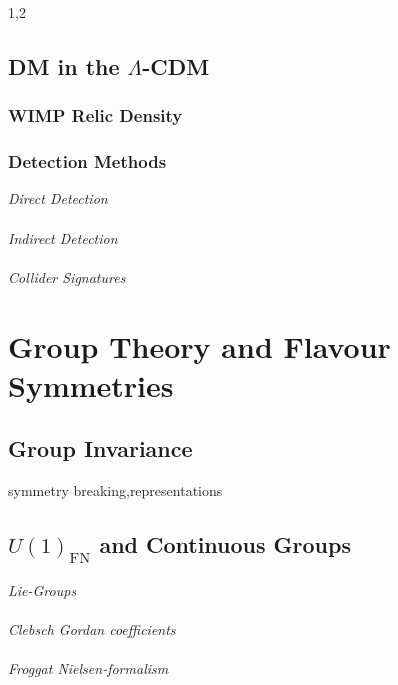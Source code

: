 \documentclass[11pt,a4paper,twoside]{article}
\numberwithin{equation}{section}
\begin{document}
\begin{spacing}{1,2}








\subsection{DM in the $\Lambda$-CDM}




\subsubsection{WIMP Relic Density}


\subsubsection{Detection Methods}
\textit{Direct Detection} \\
\\ \textit{Indirect Detection} \\
\\ \textit{Collider Signatures}

\section{Group Theory and Flavour Symmetries}
\subsection{Group Invariance}
symmetry breaking,representations
\subsection{$U(1)_\text{FN}$ and Continuous Groups}
\label{sec_FNGT}
 \textit{Lie-Groups}\\
\\ \textit{Clebsch Gordan coefficients} \\
\\ \textit{Froggat Nielsen-formalism}


\end{spacing}
\end{document}
